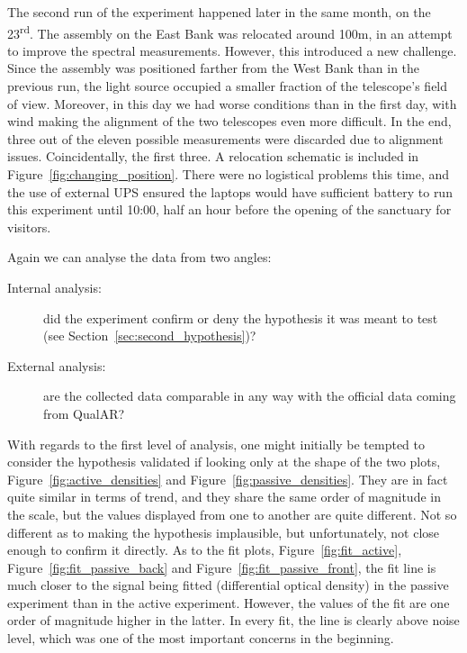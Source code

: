 The second run of the experiment happened later in the same month, on
the 23\textsuperscript{rd}. The assembly on the East Bank was relocated
around 100m, in an attempt to improve the spectral measurements.
However, this introduced a new challenge. Since the assembly was
positioned farther from the West Bank than in the previous run, the
light source occupied a smaller fraction of the telescope's field of
view. Moreover, in this day we had worse conditions than in the first
day, with wind making the alignment of the two telescopes even more
difficult. In the end, three out of the eleven possible measurements
were discarded due to alignment issues. Coincidentally, the first three.
A relocation schematic is included in
Figure~\ref{fig:changing_position}. There were no logistical problems
this time, and the use of external UPS ensured the laptops would have
sufficient battery to run this experiment until 10:00, half an hour
before the opening of the sanctuary for visitors. 

Again we can analyse the data from two angles:
\begin{description}
    \item[Internal analysis:] did the experiment confirm or deny the
        hypothesis it was meant to test (see
        Section~\ref{sec:second_hypothesis})?
    \item[External analysis:] are the collected data comparable in any
        way with the official data coming from QualAR?
\end{description}

With regards to the first level of analysis, one might initially be
tempted to consider the hypothesis validated if looking only at the
shape of the two plots, Figure~\ref{fig:active_densities} and
Figure~\ref{fig:passive_densities}. They are in fact quite similar in
terms of trend, and they share the same order of magnitude in the scale,
but the values displayed from one to another are quite different. Not so
different as to making the hypothesis implausible, but unfortunately,
not close enough to confirm it directly. As to the fit plots,
Figure~\ref{fig:fit_active}, Figure~\ref{fig:fit_passive_back} and
Figure~\ref{fig:fit_passive_front}, the fit line is much closer to the
signal being fitted (differential optical density) in the passive
experiment than in the active experiment. However, the values of the fit
are one order of magnitude higher in the latter. In every fit, the line
is clearly above noise level, which was one of the most important
concerns in the beginning. 


